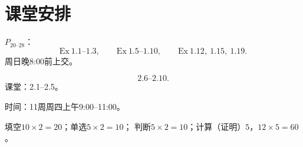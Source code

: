 \chapter*{课堂安排}
$P_{20\text{--}28}$：
\[
\mathrm{Ex}\ 1.1\text{--}1.3,\qquad
\mathrm{Ex}\ 1.5\text{--}1.10,\qquad
\mathrm{Ex}\ 1.12,\ 1.15,\ 1.19.
\]
周日晚8:00前上交。

\[
2.6\text{--}2.10.
\]
课堂：2.1--2.5。

时间：11周周四上午9:00--11:00。

填空$10\times2=20$；单选$5\times2=10$；
判断$5\times2=10$；计算（证明）$5$，$12\times5=60$。
